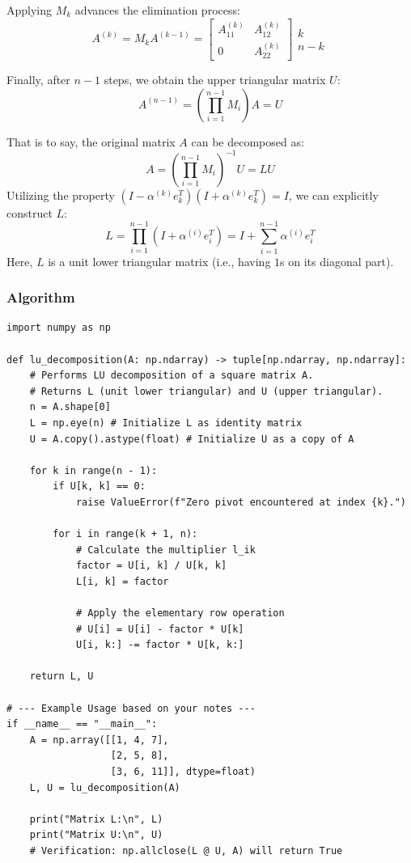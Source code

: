 \documentclass[12pt, a4paper]{article}
\theoremstyle{break}
\begin{document}
Applying $M_k$ advances the elimination process:
\begin{equation*}
    A^{(k)} = M_k A^{(k-1)} = \left[ \begin{array}{c|c} A_{11}^{(k)} & A_{12}^{(k)} \\ \hline 0 & A_{22}^{(k)} \end{array} \right] \begin{array}{l} k \\ n-k \end{array}
\end{equation*}

Finally, after $n-1$ steps, we obtain the upper triangular matrix $U$:
\begin{equation*}
    A^{(n-1)} = \left( \prod_{i=1}^{n-1} M_i \right) A = U
\end{equation*}

That is to say, the original matrix $A$ can be decomposed as:
\begin{equation*}
    A = \left( \prod_{i=1}^{n-1} M_i \right)^{-1} U = LU
\end{equation*}
Utilizing the property $(I - \alpha^{(k)} e_k^T)(I + \alpha^{(k)} 
e_k^T) = I$, we can explicitly construct $L$:
\begin{equation*}
    L = \prod_{i=1}^{n-1} (I + \alpha^{(i)} e_i^T) = I + \sum_{i=1}^{n-1} \alpha^{(i)} e_i^T
\end{equation*}
Here, $L$ is a unit lower triangular matrix (i.e., having $1$s on its diagonal part).
\subsubsection*{Algorithm}
\begin{lstlisting}
import numpy as np

def lu_decomposition(A: np.ndarray) -> tuple[np.ndarray, np.ndarray]:
    # Performs LU decomposition of a square matrix A.
    # Returns L (unit lower triangular) and U (upper triangular).
    n = A.shape[0]
    L = np.eye(n) # Initialize L as identity matrix
    U = A.copy().astype(float) # Initialize U as a copy of A

    for k in range(n - 1):
        if U[k, k] == 0:
            raise ValueError(f"Zero pivot encountered at index {k}.")
            
        for i in range(k + 1, n):
            # Calculate the multiplier l_ik
            factor = U[i, k] / U[k, k]
            L[i, k] = factor
            
            # Apply the elementary row operation
            # U[i] = U[i] - factor * U[k]
            U[i, k:] -= factor * U[k, k:]
            
    return L, U

# --- Example Usage based on your notes ---
if __name__ == "__main__":
    A = np.array([[1, 4, 7], 
                  [2, 5, 8], 
                  [3, 6, 11]], dtype=float)
    L, U = lu_decomposition(A)
    
    print("Matrix L:\n", L)
    print("Matrix U:\n", U)
    # Verification: np.allclose(L @ U, A) will return True
\end{lstlisting}
\end{document}
